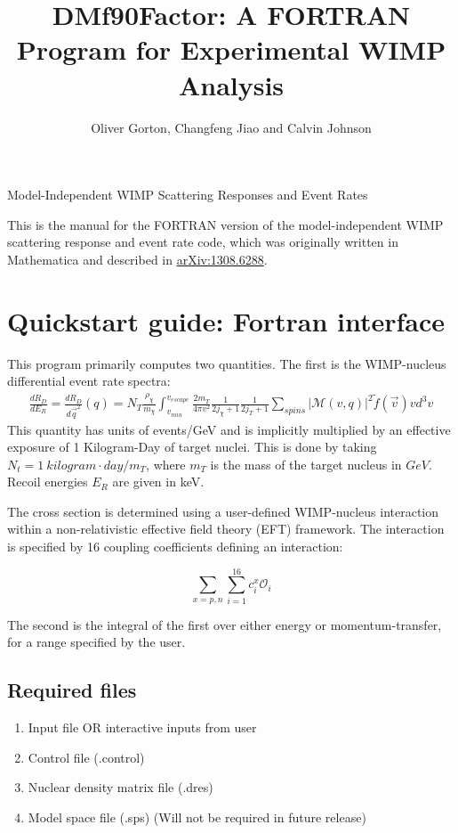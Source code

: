 \documentclass[12pt]{article}
\title{DMf90Factor: A FORTRAN Program for Experimental WIMP Analysis}
\author{Oliver Gorton, Changfeng Jiao and Calvin Johnson}
\begin{document}
\maketitle

{

\centering

Model-Independent WIMP Scattering Responses and Event Rates

}

\tableofcontents

This is the manual for the FORTRAN version of the model-independent WIMP 
scattering response and event rate code, which was originally written in 
Mathematica and described in 
\href{http://arxiv.org/abs/1308.6288v1}{arXiv:1308.6288}.

\clearpage

\section{Quickstart guide: Fortran interface}
This program primarily computes two quantities. The first is the WIMP-nucleus
differential event rate spectra:
\begin{equation}
\begin{split}
        \frac{dR_D}{dE_R} = \frac{dR_D}{d\vec{q}^2}(q)
	= N_T\frac{\rho_\chi}{m_\chi}\int_{v_{min}}^{v_{escape}} 
	\frac{2m_T}{4\pi v^2}\frac{1}{2j_\chi+1}\frac{1}{2j_T+1}
	\sum_{spins}|\mathcal{M}(v,q)|^2  \tilde{f}(\vec{v})vd^3v
\end{split}
\end{equation}
This quantity has units of events/GeV and is implicitly multiplied by
an effective exposure of 1 Kilogram-Day of target nuclei. This is done by
taking $N_t = 1\ kilogram\cdot day / m_T$, where $m_T$ is the mass of the target
nucleus in $GeV$. Recoil energies $E_R$ are given in keV.

The cross section is determined using a user-defined WIMP-nucleus interaction
within a non-relativistic effective field theory (EFT) framework. The
interaction is specified by 16 coupling coefficients defining an interaction:

\begin{equation}
	\sum_{x=p,n}\sum_{i=1}^{16} c_i^x \mathcal{O}_i
\end{equation}

The second is the integral of the first over either energy or momentum-transfer,
for a range specified by the user. 

\subsection{Required files}
\begin{enumerate}
    \item Input file OR interactive inputs from user
    \item Control file (.control)
    \item Nuclear density matrix file (.dres)
    \item Model space file (.sps) (Will not be required in future release)	    
\end{enumerate}
\end{document}
